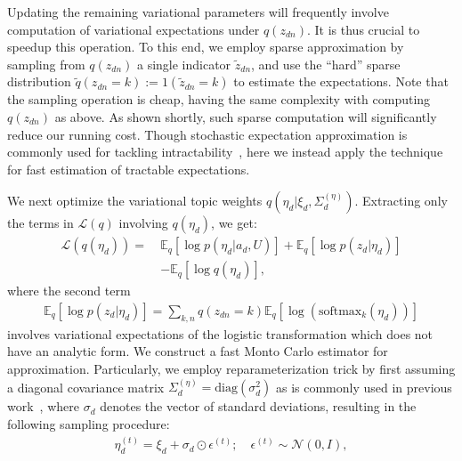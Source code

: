 \documentclass[sigconf]{acmart}
\newcommand{\E}{\mathbb{E}}
\renewcommand*{\bm}[1]{#1}%
\begin{document}
Updating the remaining variational parameters will frequently involve computation of variational expectations under $q(z_{dn})$. It is thus crucial to speedup this operation. To this end, we employ sparse approximation by sampling from $q(z_{dn})$ a single indicator $\tilde{z}_{dn}$, and use the ``hard'' sparse distribution $\tilde{q}(z_{dn}=k):=\bm{1}(\tilde{z}_{dn}=k)$ to estimate the expectations. Note that the sampling operation is cheap, having the same complexity with computing $q(z_{dn})$ as above. As shown shortly, such sparse computation will significantly reduce our running cost. Though stochastic expectation approximation is commonly used for tackling intractability~\cite{mimno2012sparse,lazaro2014doubly}, here we instead apply the technique for fast estimation of tractable expectations.

We next optimize the variational topic weights $q(\bm{\eta}_d | \bm{\xi}_d, \Sigma^{(\eta)}_d)$. Extracting only the terms in $\mathcal{L}(q)$ involving $q(\bm{\eta}_d)$, we get:
\begin{equation}\label{eq:elbo-q-eta}
\begin{split}
\mathcal{L}(q(\bm{\eta}_d)) =\  &\E_q\left[\log p(\bm{\eta}_d | \bm{a}_d, \bm{U}) \right] + \E_q\left[ \log p(\bm{z}_{d} | \bm{\eta}_d) \right] \\
&- \E_q\left[\log q(\bm{\eta}_d) \right],
\end{split}
\end{equation}
where the second term 
\begin{equation*}
\begin{split}
\E_q\left[ \log p(\bm{z}_{d} | \bm{\eta}_d) \right] = \sum\nolimits_{k,n} q(z_{dn} = k) \E_q\left[\log (\text{softmax}_k(\bm{\eta}_d))\right] 
\end{split}
\end{equation*}
involves variational expectations of the logistic transformation which does not have an analytic form. We construct a fast Monto Carlo estimator for approximation. Particularly, we employ reparameterization trick by first assuming a diagonal covariance matrix $\Sigma^{(\eta)}_d = \text{diag}(\bm{\sigma}_d^2)$ as is commonly used in previous work~\cite{blei2007correlated,kingma2013auto}, where $\bm{\sigma}_d$ denotes the vector of standard deviations, resulting in the following sampling procedure:
\begin{equation}
\begin{split}
\bm{\eta}^{(t)}_d = \bm{\xi}_d + \bm{\sigma}_d \odot \bm{\epsilon}^{(t)};\quad \bm{\epsilon}^{(t)} \sim \mathcal{N}(\bm{0},\bm{I}),
\end{split}
\end{equation}
\end{document}
